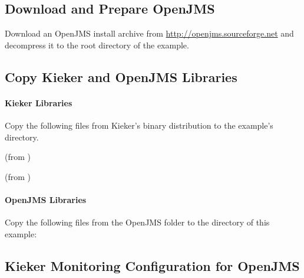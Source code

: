 \subsection{Download and Prepare OpenJMS}

Download an OpenJMS install archive from \url{http://openjms.sourceforge.net} %
and decompress it to the root directory of the example. 

\subsection{Copy Kieker and OpenJMS Libraries}

\paragraph*{Kieker Libraries}

Copy the following files from Kieker's binary distribution to %
the example's  directory.

\begin{compactenum}
 \item \file{\mainJar} (from )
 \item \file{\commonsLoggingJar} (from )
\end{compactenum}

\paragraph*{OpenJMS Libraries}

Copy the following files from the OpenJMS  folder to the %
 directory of this example:

\begin{compactenum}
\item {}
\item {}
\item {}
\item {}
\item {}
\item {}
\end{compactenum}

\subsection{Kieker Monitoring Configuration for OpenJMS}


